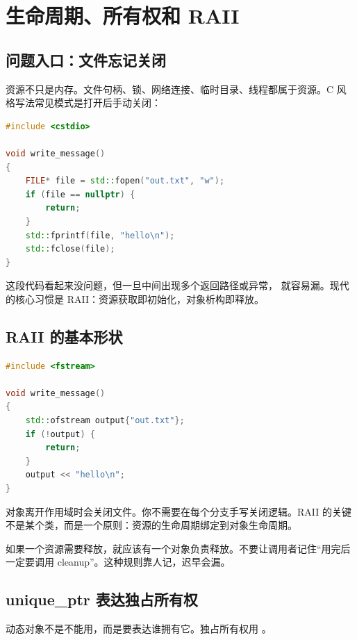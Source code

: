 \chapter{生命周期、所有权和 RAII}

\section{问题入口：文件忘记关闭}

资源不只是内存。文件句柄、锁、网络连接、临时目录、线程都属于资源。C 风格写法常见模式是打开后手动关闭：

\begin{lstlisting}[language=C++,caption={手动管理文件资源容易遗漏}]
#include <cstdio>

void write_message()
{
    FILE* file = std::fopen("out.txt", "w");
    if (file == nullptr) {
        return;
    }
    std::fprintf(file, "hello\n");
    std::fclose(file);
}
\end{lstlisting}

这段代码看起来没问题，但一旦中间出现多个返回路径或异常， 就容易漏。现代 \cpp 的核心习惯是 RAII：资源获取即初始化，对象析构即释放。

\section{RAII 的基本形状}

\begin{lstlisting}[language=C++,caption={用 ofstream 自动管理文件}]
#include <fstream>

void write_message()
{
    std::ofstream output{"out.txt"};
    if (!output) {
        return;
    }
    output << "hello\n";
}
\end{lstlisting}

 对象离开作用域时会关闭文件。你不需要在每个分支手写关闭逻辑。RAII 的关键不是某个类，而是一个原则：资源的生命周期绑定到对象生命周期。

\begin{keyidea}
如果一个资源需要释放，就应该有一个对象负责释放。不要让调用者记住“用完后一定要调用 cleanup”。这种规则靠人记，迟早会漏。
\end{keyidea}

\section{unique\_ptr 表达独占所有权}

动态对象不是不能用，而是要表达谁拥有它。独占所有权用 。

